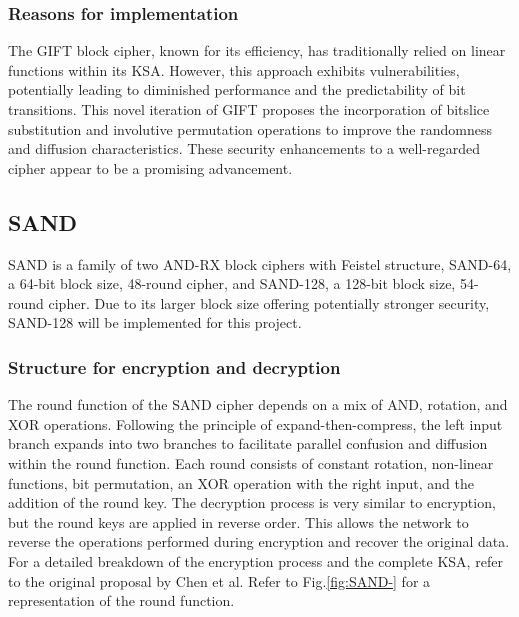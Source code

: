 \documentclass[conference]{IEEEtran}
\begin{document}
\subsubsection{Reasons for implementation}

The GIFT block cipher, known for its efficiency, has traditionally relied on linear functions within its KSA. However, this approach exhibits vulnerabilities, potentially leading to diminished performance and the predictability of bit transitions. This novel iteration of GIFT proposes the incorporation of bitslice substitution and involutive permutation operations to improve the randomness and diffusion characteristics. These security enhancements to a well-regarded cipher appear to be a promising advancement.

\subsection{SAND}
SAND is a family of two AND-RX block ciphers with Feistel structure, SAND-64, a 64-bit block size, 48-round cipher, and SAND-128, a 128-bit block size, 54-round cipher. Due to its larger block size offering potentially stronger security, SAND-128 will be implemented for this project\cite{SAND}.
\subsubsection{Structure for encryption and decryption}
The round function of the SAND cipher depends on a mix of AND, rotation, and XOR operations. Following the principle of expand-then-compress, the left input branch expands into two branches to facilitate parallel confusion and diffusion within the round function. Each round consists of constant rotation, non-linear functions, bit permutation, an XOR operation with the right input, and the addition of the round key. The decryption process is very similar to encryption, but the round keys are applied in reverse order. This allows the network to reverse the operations performed during encryption and recover the original data. For a detailed breakdown of the encryption process and the complete KSA, refer to the original proposal by Chen et al\cite{SAND}. Refer to Fig.\ref{fig:SAND-} for a representation of the round function.
\end{document}
